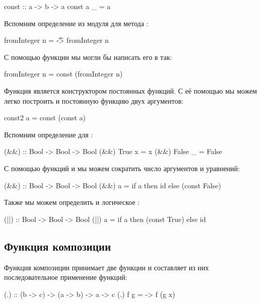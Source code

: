 \begin{code}
const :: a -> b -> a
const a _ = a
\end{code}

Вспомним определение из модуля  для метода
:

\begin{code}
    fromInteger n = \t -> fromInteger n
\end{code}

С помощью функции  мы могли бы написать его
в так:

\begin{code}
    fromInteger n = const (fromInteger n)
\end{code}

Функция  является конструктором постоянных
функций. С её помощью мы можем легко построить и постоянную
функцию двух аргументов:

\begin{code}
const2 a = const (const a)
\end{code}

Вспомним определение для \In{&&}:

\begin{code}
(&&) :: Bool -> Bool -> Bool
(&&) True   x  = x
(&&) False  _  = False  
\end{code}

С помощью функций  и  мы можем сократить число 
аргументов и уравнений:

\begin{code}
(&&) :: Bool -> Bool -> Bool
(&&) a = if a then id else (const False)
\end{code}

Также мы можем определить и логическое :

\begin{code}
(||) :: Bool -> Bool -> Bool
(||) a = if a then (const True) else id
\end{code}

\subsection{Функция композиции}

Функция композиции принимает две функции и составляет
из них последовательное применение функций:

\begin{code}
(.) :: (b -> c) -> (a -> b) -> a -> c
(.) f g = \x -> f (g x)
\end{code}

